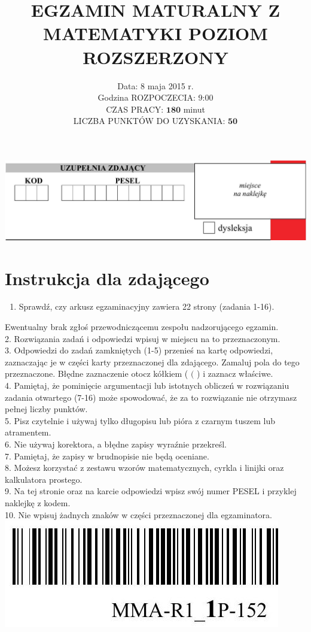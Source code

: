 \documentclass[10pt]{article}
\title{EGZAMIN MATURALNY Z MATEMATYKI POZIOM ROZSZERZONY }
\author{Data: 8 maja 2015 r.\\
Godzina ROZPOCZECIA: 9:00\\
CZAS PRACY: \(\mathbf{1 8 0}\) minut\\
LICZBA PUNKTÓW DO UZYSKANIA: \(\mathbf{5 0}\)}
\date{}
\begin{document}
\maketitle
\begin{center}
\includegraphics[max width=\textwidth]{2024_11_21_838c0cfd77f195c20440g-01(1)}
\end{center}



\section*{Instrukcja dla zdającego}
\begin{enumerate}
  \item Sprawdź, czy arkusz egzaminacyjny zawiera 22 strony (zadania 1-16).
\end{enumerate}

Ewentualny brak zgłoś przewodniczącemu zespołu nadzorującego egzamin.\\
2. Rozwiązania zadań i odpowiedzi wpisuj w miejscu na to przeznaczonym.\\
3. Odpowiedzi do zadań zamkniętych (1-5) przenieś na kartę odpowiedzi, zaznaczając je w części karty przeznaczonej dla zdającego. Zamaluj pola do tego przeznaczone. Błędne zaznaczenie otocz kółkiem ( \((\) ) i zaznacz właściwe.\\
4. Pamiętaj, że pominięcie argumentacji lub istotnych obliczeń w rozwiązaniu zadania otwartego (7-16) może spowodować, że za to rozwiązanie nie otrzymasz pełnej liczby punktów.\\
5. Pisz czytelnie i używaj tylko długopisu lub pióra z czarnym tuszem lub atramentem.\\
6. Nie używaj korektora, a błędne zapisy wyraźnie przekreśl.\\
7. Pamiętaj, że zapisy w brudnopisie nie będą oceniane.\\
8. Możesz korzystać z zestawu wzorów matematycznych, cyrkla i linijki oraz kalkulatora prostego.\\
9. Na tej stronie oraz na karcie odpowiedzi wpisz swój numer PESEL i przyklej naklejkę z kodem.\\
10. Nie wpisuj żadnych znaków w części przeznaczonej dla egzaminatora.\\
\includegraphics[max width=\textwidth, center]{2024_11_21_838c0cfd77f195c20440g-01}
\end{document}
